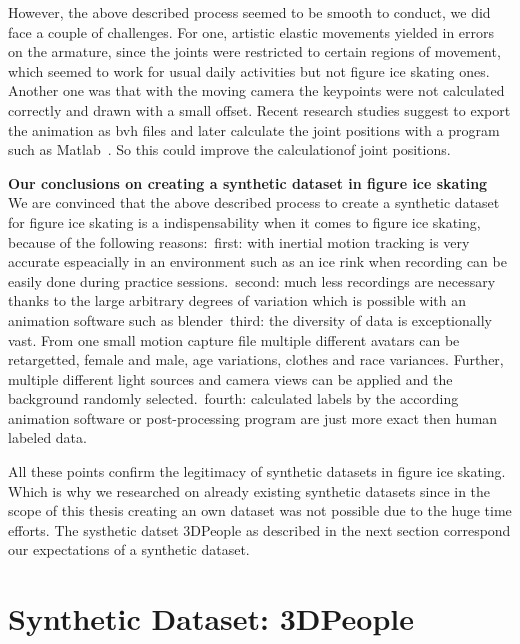 However, the above described process seemed to be smooth to conduct, we did face a couple of challenges.
For one, artistic elastic movements yielded in errors on the armature, since the joints were restricted to certain
regions of movement, which seemed to work for usual daily activities but not figure ice skating ones.
Another one was that with the moving camera the keypoints were not calculated correctly and drawn with a small offset.
Recent research studies suggest to export the animation as bvh files and later calculate the joint positions with a
program such as Matlab~\cite{synpose300, 3dpeople, gaitblender}. So this could improve the calculationof joint
positions.

\textbf{Our conclusions on creating a synthetic dataset in figure ice skating}\\
We are convinced that the above described process to create a synthetic dataset for figure ice skating is a
indispensability when it comes to figure ice skating,
because of the following reasons:\
first: with inertial motion tracking is very accurate espeacially in an environment such as an ice rink when recording
can be easily done during practice sessions.\
second: much less recordings are necessary thanks to the large arbitrary degrees of variation which is possible with
an animation software such as blender\
third: the diversity of data is exceptionally vast.
From one small motion capture file multiple different avatars can be retargetted, female and male, age variations,
clothes and race variances.
Further, multiple different light sources and camera views can be applied and the background randomly selected.\
fourth: calculated labels by the according animation software or post-processing program are just more exact then
human labeled data.

All these points confirm the legitimacy of synthetic datasets in figure ice skating.
Which is why we researched on already existing synthetic datasets since in the scope of this thesis creating an own
dataset was not possible due to the huge time efforts.
The systhetic datset 3DPeople as described in the next section correspond our expectations of a synthetic dataset.




\section{Synthetic Dataset: 3DPeople}

